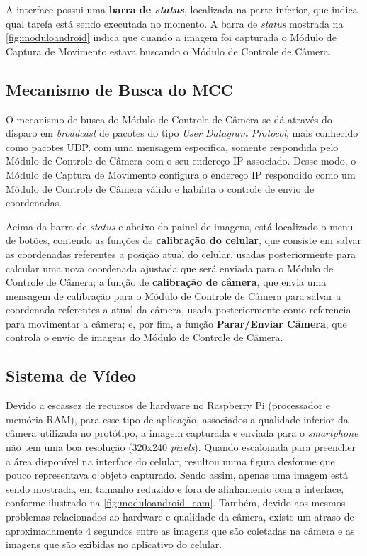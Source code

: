 A interface possui uma \textbf{barra de \textit{status}}, localizada na parte inferior, que indica qual tarefa está sendo executada no momento. A barra de \textit{status} mostrada na \autoref{fig:moduloandroid} indica que quando a imagem foi capturada o Módulo de Captura de Movimento estava buscando o Módulo de Controle de Câmera.\par

\subsection{Mecanismo de Busca do MCC}
\label{subsec:mecanismobuscamcc}

O mecanismo de busca do Módulo de Controle de Câmera se dá através do disparo em \textit{broadcast} de pacotes do tipo \textit{User Datagram Protocol}, mais conhecido como pacotes UDP, com uma mensagem especifica, somente respondida pelo Módulo de Controle de Câmera com o seu endereço IP associado. Desse modo, o Módulo de Captura de Movimento configura o endereço IP respondido como um Módulo de Controle de Câmera válido e habilita o controle de envio de coordenadas.\par

Acima da barra de \textit{status} e abaixo do painel de imagens, está localizado o menu de botões, contendo as funções de \textbf{calibração do celular}, que consiste em salvar as coordenadas referentes a posição atual do celular, usadas posteriormente para calcular uma nova coordenada ajustada que será enviada para o Módulo de Controle de Câmera; a função de \textbf{calibração de câmera}, que envia uma mensagem de calibração para o Módulo de Controle de Câmera para salvar a coordenada referentes a atual da câmera, usada posteriormente como referencia para movimentar a câmera; e, por fim, a função \textbf{Parar/Enviar Câmera}, que controla o envio de imagens do Módulo de Controle de Câmera.\par

\subsection{Sistema de Vídeo}
\label{subsec:sistemadevideo}

Devido a escassez de recursos de hardware no Raspberry Pi (processador e memória RAM), para esse tipo de aplicação, associados a qualidade inferior da câmera utilizada no protótipo, a imagem capturada e enviada para o \textit{smartphone} não tem uma boa resolução (320x240 \textit{pixels}). Quando escalonada para preencher a área disponível na interface do celular, resultou numa figura desforme que pouco representava o objeto capturado. Sendo assim, apenas uma imagem está sendo mostrada, em tamanho reduzido e fora de alinhamento com a interface, conforme ilustrado na \autoref{fig:moduloandroid_cam}. Também, devido aos mesmos problemas relacionados ao hardware e qualidade da câmera, existe um atraso de aproximadamente 4 segundos entre as imagens que são coletadas na câmera e as imagens que são exibidas no aplicativo do celular.

